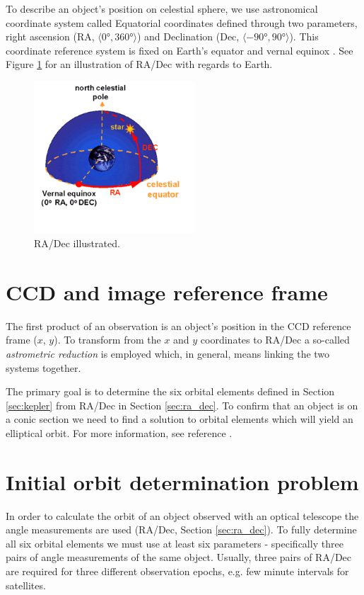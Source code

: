 	To describe an object's position on celestial sphere, we use astronomical coordinate system called Equatorial coordinates defined through two parameters, right ascension (RA, $\langle\ang{0},\ang{360}\rangle$) and Declination (Dec, $\langle\ang{-90},\ang{90}\rangle$). This coordinate reference system is fixed on Earth's equator and vernal equinox \citep{montenbruck2005satellite}. See Figure \ref{fig:equatorial} for an illustration of RA/Dec with regards to Earth.
	
	\begin{figure}[H]
	\centering
	  \includegraphics[width=6cm]{images/equatorial}
		  \caption{RA/Dec illustrated.}
	  \label{fig:equatorial}
	\end{figure}

\section{CCD and image reference frame}\label{sec:ccd}

	The first product of an observation is an object's position in the CCD reference frame ($x$, $y$). To transform from the $x$ and $y$ coordinates to RA/Dec a so-called \emph{astrometric reduction} is employed which, in general, means linking the two systems together.
	
	The primary goal is to determine the six orbital elements defined in Section \ref{sec:kepler} from RA/Dec in Section \ref{sec:ra_dec}. To confirm that an object is on a conic section we need to find a solution to orbital elements which will yield an elliptical orbit. For more information, see reference \citep{montenbruck2005satellite}.
	
\section{Initial orbit determination problem}\label{sec:init_orbit_det}
	
	In order to calculate the orbit of an object observed with an optical telescope the angle measurements are used (RA/Dec, Section \ref{sec:ra_dec}). To fully determine all six orbital elements we must use at least six parameters - specifically three pairs of angle measurements of the same object. Usually, three pairs of RA/Dec are required for three different observation epochs, e.g. few minute intervals for satellites. 	
	
